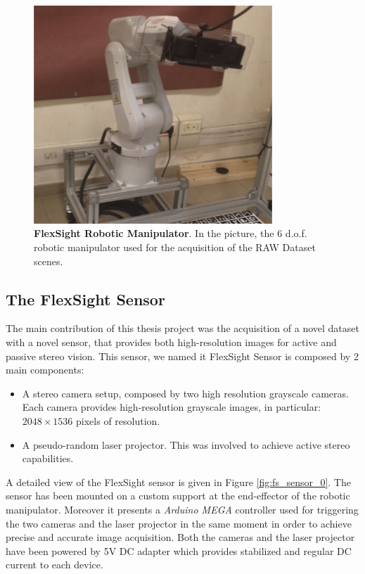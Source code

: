 \begin{figure}
    \centering
    \includegraphics[width=0.8\textwidth]{figures/3_raw_dataset/raw_robot_example}
    \caption{\textbf{FlexSight Robotic Manipulator}. In the picture, the 6 d.o.f. robotic manipulator used for the acquisition of the RAW Dataset scenes.}
    \label{fig:raw_robot_example}
\end{figure}

\subsection{The FlexSight Sensor}\label{subsec:raw_setup_fss}
The main contribution of this thesis project was the acquisition of a novel dataset with a novel sensor, that provides both high-resolution images for active and passive stereo vision. This sensor, we named it FlexSight Sensor is composed by 2 main components:

\begin{itemize}
	\item A stereo camera setup, composed by two high resolution grayscale cameras. Each camera provides high-resolution grayscale images, in particular: $2048\times1536$ pixels of resolution.
	\item A pseudo-random laser projector. This was involved to achieve active stereo capabilities.
\end{itemize}

A detailed view of the FlexSight sensor is given in Figure \ref{fig:fs_sensor_0}. The sensor has been mounted on a custom support at the end-effector of the robotic manipulator. Moreover it presents a \emph{Arduino MEGA} controller used for triggering the two cameras and the laser projector in the same moment in order to achieve precise and accurate image acquisition. Both the cameras and the laser projector have been powered by 5V DC adapter which provides stabilized and regular DC current to each device.

